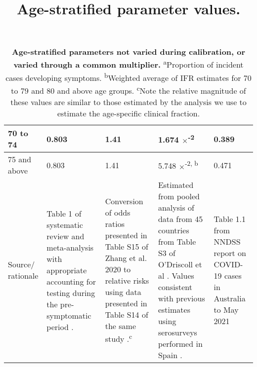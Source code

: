 \begin{table}[ht]
\begin{tabular}[ht]{| p{2cm} | p{2.5cm} | p{3cm} | p{3cm} | p{2.5cm}|}
        \hline
        70 to 74 & 0.803 & 1.41 & 1.674 $\times$\textsuperscript{-2} & 0.389 \\
        \hline
        75 and above & 0.803 & 1.41 & 5.748 $\times$\textsuperscript{-2, b} & 0.471 \\
        \hline
        Source/ rationale & 
        Table 1 of systematic review and meta-analysis with appropriate accounting for testing during the pre-symptomatic period \cite{RN140}. & 
        Conversion of odds ratios presented in Table S15 of Zhang et al. 2020 to relative risks using data presented in Table S14 of the same study \cite{RN7}.\textsuperscript{c} &
        Estimated from pooled analysis of data from 45 countries from Table S3 of O'Driscoll et al \cite{RN6}. Values consistent with previous estimates using serosurveys performed in Spain \cite{RN21}. &
        Table 1.1 from NNDSS report on COVID-19 cases in Australia to May 2021 \\ \hline
	\end{tabular}
	\title{Age-stratified parameter values.}
	\caption{\textbf{Age-stratified parameters not varied during calibration, or varied through a common multiplier.} \textsuperscript{a}Proportion of incident cases developing symptoms. \textsuperscript{b}Weighted average of IFR estimates for 70 to 79 and 80 and above age groups. \textsuperscript{c}Note the relative magnitude of these values are similar to those estimated by the analysis we use to estimate the age-specific clinical fraction.}
	\label{tab:age_params}
\end{table}

\clearpage